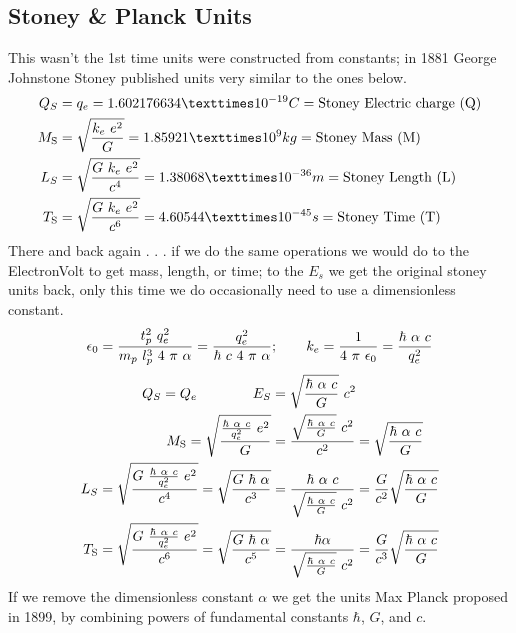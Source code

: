 \begin{multicols}{2}
\subsection*{Stoney \& Planck Units}
This wasn't the 1st time units were constructed from constants; in 1881 George Johnstone Stoney published units very similar to the ones below\citep{Stoney1883}.
\begin{align*}
Q_S &= q_e = 1.602176634×10^{-19} C =\text{Stoney Electric charge (Q)} \\
M_{{\text{S}}}&= \sqrt{k_e ~e^2\over G} = 1.85921×10^9 kg = \text{Stoney Mass (M)} \\
L_S&=\sqrt{G~k_e~e^2\over c^4} =1.38068×10^{-36} m = \text{Stoney Length (L)} \\
T_{{\text{S}}}&=\sqrt{G~k_e ~e^2\over c^{6}} = 4.60544×10^{-45} s = \text{Stoney Time (T)}
\end{align*}
There and back again . . . if we do the same operations we would do to the ElectronVolt to get mass, length, or time; to the $E_s$ we get the original stoney units back, only this time we do occasionally need to use a dimensionless constant.
$$\epsilon _0 ={t_p^2 ~q_e^2 \over m_p~ l_p^3 ~4~\pi~ \alpha}={q_e^2 \over \hbar ~ c ~4~\pi~ \alpha};\qquad
k_e={1 \over 4~ \pi ~ \epsilon _ 0}={\hbar ~ \alpha ~ c \over q_e^2}$$
\begin{align*}
Q_S =Q_e \qquad\qquad E_S&= {\sqrt{\hbar ~ \alpha ~c\over G}~c^2}\\
M_{{\text{S}}} =\sqrt{{\hbar ~ \alpha ~ c \over q_e^2} ~e^2\over G}& = {{\sqrt{\hbar ~ \alpha ~c\over G}~c^2} \over c^2}= \sqrt{\hbar ~ \alpha ~c \over G}\\
L_S=\sqrt{G~{\hbar ~ \alpha ~ c \over q_e^2}~e^2\over c^4}= \sqrt{G~\hbar ~ \alpha \over c^3} &={\hbar ~ \alpha ~ c\over {\sqrt{\hbar ~ \alpha ~c\over G}~c^2}}={G\over {c^2}}\sqrt{\hbar ~ \alpha ~c\over G}\\
T_{{\text{S}}}=\sqrt{G~{\hbar ~ \alpha ~ c \over q_e^2} ~e^2\over c^{6}}= \sqrt{G~\hbar ~ \alpha \over c^5} &={\hbar  \alpha \over {\sqrt{\hbar ~ \alpha ~c\over G}~c^2}}= {G\over {c^3}}\sqrt{\hbar ~ \alpha ~c\over G}
\end{align*}
If we remove the dimensionless constant $\alpha$ we get the units Max Planck proposed in 1899, by combining powers of fundamental constants $\hbar$, $G$, and $c$.

\end{multicols}
